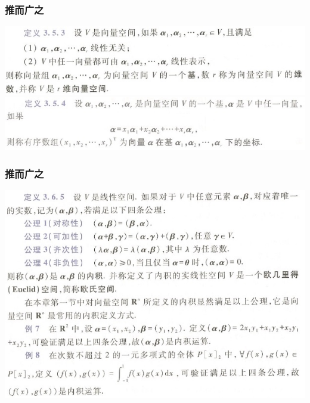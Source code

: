 \documentclass[CJKutf8,xcolor=pdftex,dvipsnames,table]{beamer}
\begin{document}
\begin{CJK*}{UTF8}{song}
  \begin{frame}
    \frametitle{推而广之}
    \begin{center}
      \includegraphics[scale=.5]{cqu-la-def-3-5-3}
      \includegraphics[scale=.5]{cqu-la-def-3-5-4}

    \end{center}
  \end{frame}   

  \begin{frame}
    \frametitle{推而广之}
    \begin{center}
      \includegraphics[scale=.5]{cqu-la-def-3-6-5}

    \end{center}
  \end{frame}   


\end{CJK*}
\end{document}
